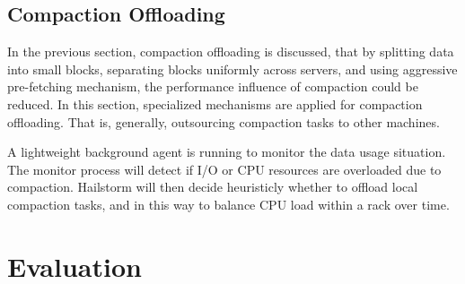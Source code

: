 \documentclass[a4paper,10pt,twoside]{article}
\begin{document}
\subsection{Compaction Offloading}
\par
In the previous section, compaction offloading is discussed, that by splitting data into small blocks, separating blocks uniformly across servers, 
and using aggressive pre-fetching mechanism, the performance influence of compaction could be reduced.
In this section, specialized mechanisms are applied for compaction offloading.
That is, generally, outsourcing compaction tasks to other machines.
\par
A lightweight background agent is running to monitor the data usage situation. 
The monitor process will detect if I/O or CPU resources are overloaded due to compaction.
Hailstorm will then decide heuristicly whether to offload local compaction tasks, and in this way to balance CPU load within a rack over time.


\section{Evaluation}
\end{document}
